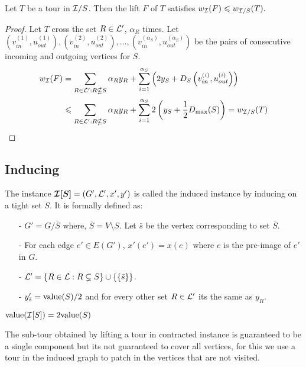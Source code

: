\documentclass[./main.tex]{subfiles}
\begin{document}
	\begin{lemma}\label{lemm:3:lift-c}
		Let $T$ be a tour in $\mathcal{I}/S$. Then the lift $F$ of $T$ satisfies $w_{\mathcal{I}}(F) \leqslant w_{\mathcal{I}/S}(T).$
	\end{lemma}
	\begin{proof}
		Let $T$ cross the set $R\in\mathcal{L}'$, $\alpha_R$ times. Let $\left(v_{in}^{(1)}, u_{out}^{(1)}\right), \left(v_{in}^{(2)}, u_{out}^{(2)}\right), \dots, \left(v_{in}^{(\alpha_S)}, u_{out}^{(\alpha_S)}\right)$ be the pairs of consecutive incoming and outgoing vertices for $S$.
		\begin{align*}
			w_{\mathcal{I}}(F) &= \sum_{R \in \mathcal{L}': R \nsubseteq S}\alpha_R y_R + \sum_{i = 1}^{\alpha_S}\left(2y_S + D_S\left(v_{in}^{(i)}, u_{out}^{(i)}\right)\right)\\
			&\leqslant\sum_{R \in \mathcal{L}': R \nsubseteq S}\alpha_R y_R + \sum_{i = 1}^{\alpha_S}2\left(y_S + \frac{1}{2}D_{\max}(S)\right) = w_{\mathcal{I}/S}(T)
		\end{align*}
	\end{proof}
	
	\subsection{Inducing}
	\begin{definition}
		The instance $\bm{\mathcal{I}[S]} = (G', \mathcal{L}', x', y')$ is called the induced instance by inducing on a tight set $S$. It is formally defined as:
		\begin{itemize}
			\item[-] $G' = G/\bar{S}$ where, $\bar{S} = V\setminus S$. Let $\bar{s}$ be the vertex corresponding to set $\bar{S}$.
			\item[-] For each edge $e' \in E(G')$, $x'(e') = x(e)$ where $e$ is the pre-image of $e'$ in $G$.
			\item[-] $\mathcal{L}' = \{R \in \mathcal{L} : R \subsetneq S\} \cup \{\{\bar{s}\}\}$.
			\item[-] $y'_{\bar{s}} = \textup{value}(S)/2$ and for every other set $R \in \mathcal{L}'$ its the same as $y_R$.\\
		\end{itemize}
	\end{definition}\vspace{2mm}
	
	\begin{fact}
		$\textup{value}(\mathcal{I}[S]) = 2 \textup{value}(S)$
	\end{fact}

	The sub-tour obtained by lifting a tour in contracted instance is guaranteed to be a single component but its not guaranteed to cover all vertices, for this we use a tour in the induced graph to patch in the vertices that are not visited.\\
	
\end{document}
